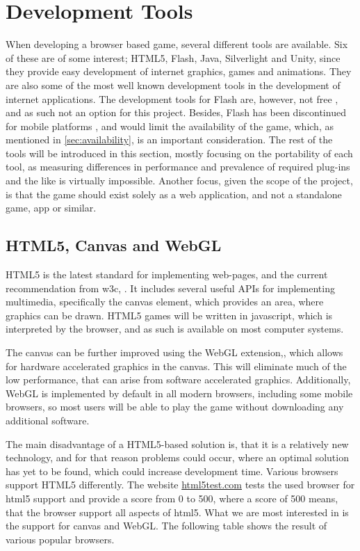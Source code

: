 \section{Development Tools}
\label{sec:tools}

When developing a browser based game, several different tools are available.
Six of these are of some interest; HTML5, Flash, Java, Silverlight and Unity, since they provide easy development of internet graphics, games and animations.
They are also some of the most well known development tools in the development of internet applications.
The development tools for Flash are, however, not free \cite{adobe13}, and as such not an option for this project.
Besides, Flash has been discontinued for mobile platforms \cite{adobe12}, and would limit the availability of the game, which, as mentioned in \autoref{sec:availability}, is an important consideration.
The rest of the tools will be introduced in this section, mostly focusing on the portability of each tool, as measuring differences in performance and prevalence of required plug-ins and the like is virtually impossible.
Another focus, given the scope of the project, is that the game should exist solely as a web application, and not a standalone game, app or similar.

\subsection{HTML5, Canvas and WebGL}
HTML5 is the latest standard for implementing web-pages, and the current recommendation from \ac{w3c}, \cite{html513}.
It includes several useful APIs for implementing multimedia, specifically the canvas element, which provides an area, where graphics can be drawn.
HTML5 games will be written in javascript, which is interpreted by the browser, and as such is available on most computer systems.\newline

The canvas can be further improved using the WebGL extension,\cite{khronos13}, which allows for hardware accelerated graphics in the canvas. 
This will eliminate much of the low performance, that can arise from software accelerated graphics.
Additionally, WebGL is implemented by default in all modern browsers, including some mobile browsers, so most users will be able to play the game without downloading any additional software.

The main disadvantage of a HTML5-based solution is, that it is a relatively new technology, and for that reason problems could occur, where an optimal solution has yet to be found, which could increase development time. Various browsers support HTML5 differently. The website \url{html5test.com} tests the used browser for html5 support and provide a score from 0 to 500, where a score of 500 means, that the browser support all aspects of html5. What we are most interested in is the support for canvas and WebGL. The following table shows the result of various popular browsers.

